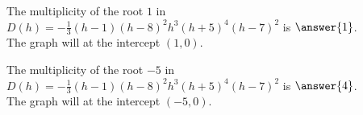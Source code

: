 \documentclass{ximera}
\begin{document}
\begin{exercise}
\begin{question}



The multiplicity of the root $1$ in $D(h) = -\frac{1}{3} (h - 1) (h - 8)^2 h^3 (h + 5)^4 (h - 7)^2$ is $\answer{1}$. \\



The graph will  at the intercept $(1, 0)$.




\end{question}












\begin{question}



The multiplicity of the root $-5$ in $D(h) = -\frac{1}{3} (h - 1) (h - 8)^2 h^3 (h + 5)^4 (h - 7)^2$ is $\answer{4}$. \\



The graph will  at the intercept $(-5, 0)$.




\end{question}








\end{exercise}
\end{document}
